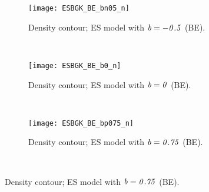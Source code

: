 \documentclass{rsproca}%
\begin{document}
\begin{figure}
        \centering
        \begin{subfigure}[b]{0.32\textwidth}
                \centering
                \texttt{[image: ESBGK\_BE\_bn05\_n]}
                \caption{Density contour; ES model with $\it{b=-0.5}$ (BE).}
                \label{fig:ESBGK_BE_bn05_n}
        \end{subfigure}%
        ~ %
        \begin{subfigure}[b]{0.32\textwidth}
                \centering
                \texttt{[image: ESBGK\_BE\_b0\_n]}
                \caption{Density contour; ES model with $\it{b=0}$ (BE).}
                \label{fig:ESBGK_BE_b0_n}
        \end{subfigure}
        ~ %
        \begin{subfigure}[b]{0.32\textwidth}
                \centering
                \texttt{[image: ESBGK\_BE\_bp075\_n]}
                \caption{Density contour; ES model with $\it{b=0.75}$ (BE).}
                \label{fig:ESBGK_BE_bp075_n}
        \end{subfigure}
				~ %

\end{figure}
\end{document}
